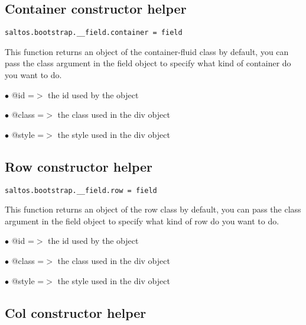 \documentclass[a4paper]{book}
\begin{document}
\hypertarget{toc457}{}
\subsection{Container constructor helper}

\begin{lstlisting}
saltos.bootstrap.__field.container = field
\end{lstlisting}

This function returns an object of the container-fluid class by default, you can pass the class
argument in the field object to specify what kind of container do you want to do.

\begin{compactitem}
\item[\color{myblue}$\bullet$] @id    =$>$ the id used by the object
\item[\color{myblue}$\bullet$] @class =$>$ the class used in the div object
\item[\color{myblue}$\bullet$] @style =$>$ the style used in the div object
\end{compactitem}

\hypertarget{toc458}{}
\subsection{Row constructor helper}

\begin{lstlisting}
saltos.bootstrap.__field.row = field
\end{lstlisting}

This function returns an object of the row class by default, you can pass the class argument
in the field object to specify what kind of row do you want to do.

\begin{compactitem}
\item[\color{myblue}$\bullet$] @id    =$>$ the id used by the object
\item[\color{myblue}$\bullet$] @class =$>$ the class used in the div object
\item[\color{myblue}$\bullet$] @style =$>$ the style used in the div object
\end{compactitem}

\hypertarget{toc459}{}
\subsection{Col constructor helper}
\end{document}
